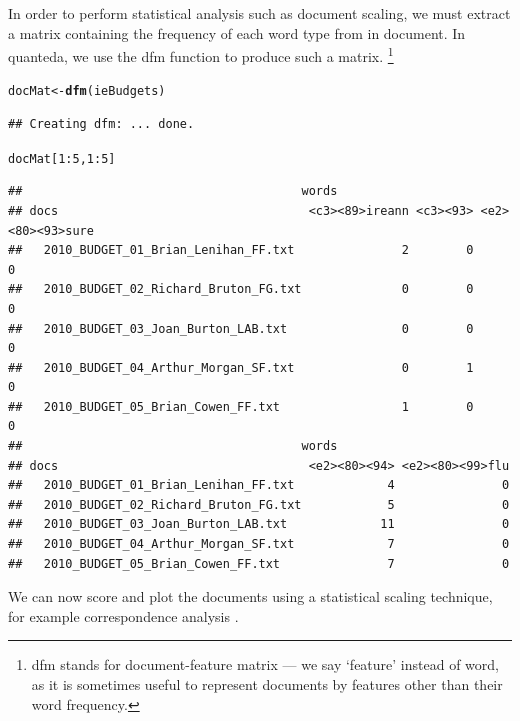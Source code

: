 \documentclass{article}\usepackage[]{graphicx}\usepackage[]{color}
\makeatletter
\newcommand{\hlnum}[1]{\textcolor[rgb]{0.686,0.059,0.569}{#1}}%
\newcommand{\hlopt}[1]{\textcolor[rgb]{0,0,0}{#1}}%
\newcommand{\hlstd}[1]{\textcolor[rgb]{0.345,0.345,0.345}{#1}}%
\newcommand{\hlkwb}[1]{\textcolor[rgb]{0.69,0.353,0.396}{#1}}%
\newcommand{\hlkwd}[1]{\textcolor[rgb]{0.737,0.353,0.396}{\textbf{#1}}}%
\newenvironment{kframe}{%
 \def\at@end@of@kframe{}%
 \ifinner\ifhmode%
  \def\at@end@of@kframe{\end{minipage}}%
  \begin{minipage}{\columnwidth}%
 \fi\fi%
 \def\FrameCommand##1{\hskip\@totalleftmargin \hskip-\fboxsep
 \colorbox{shadecolor}{##1}\hskip-\fboxsep
     \hskip-\linewidth \hskip-\@totalleftmargin \hskip\columnwidth}%
 \MakeFramed {\advance\hsize-\width
   \@totalleftmargin\z@ \linewidth\hsize
   \@setminipage}}%
 {\par\unskip\endMakeFramed%
 \at@end@of@kframe}
\newenvironment{knitrout}{}{} %
\makeatother
\begin{document}
In order to perform statistical analysis such as document scaling, we must extract a matrix containing the frequency of each word type from in document. In quanteda, we use the dfm function to produce such a matrix. \footnote{dfm stands for document-feature matrix --- we say `feature' instead of word, as it is sometimes useful to represent documents by features other than their word frequency.}

\begin{knitrout}
\color{fgcolor}\begin{kframe}
\begin{alltt}
\hlstd{docMat} \hlkwb{<-} \hlkwd{dfm}\hlstd{(ieBudgets)}
\end{alltt}
\begin{verbatim}
## Creating dfm: ... done.
\end{verbatim}
\begin{alltt}
\hlstd{docMat[}\hlnum{1}\hlopt{:}\hlnum{5}\hlstd{,} \hlnum{1}\hlopt{:}\hlnum{5}\hlstd{]}
\end{alltt}
\begin{verbatim}
##                                       words
## docs                                   <c3><89>ireann <c3><93> <e2><80><93>sure
##   2010_BUDGET_01_Brian_Lenihan_FF.txt               2        0                0
##   2010_BUDGET_02_Richard_Bruton_FG.txt              0        0                0
##   2010_BUDGET_03_Joan_Burton_LAB.txt                0        0                0
##   2010_BUDGET_04_Arthur_Morgan_SF.txt               0        1                0
##   2010_BUDGET_05_Brian_Cowen_FF.txt                 1        0                0
##                                       words
## docs                                   <e2><80><94> <e2><80><99>flu
##   2010_BUDGET_01_Brian_Lenihan_FF.txt             4               0
##   2010_BUDGET_02_Richard_Bruton_FG.txt            5               0
##   2010_BUDGET_03_Joan_Burton_LAB.txt             11               0
##   2010_BUDGET_04_Arthur_Morgan_SF.txt             7               0
##   2010_BUDGET_05_Brian_Cowen_FF.txt               7               0
\end{verbatim}
\end{kframe}
\end{knitrout}


We can now score and plot the documents using a statistical scaling technique, for example correspondence analysis \citep{nenadic2007}.
\end{document}

